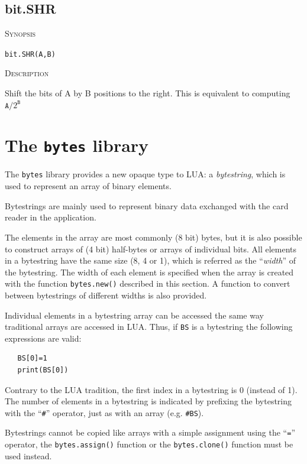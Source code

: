 \documentclass[11pt]{report}
\newcommand{\mansection}[1]{\vspace{0.5em}\par\noindent\textsc{#1}\vspace{0.5em}\par}
\newcommand{\syn}[1]{\texttt{#1}}
\begin{document}
\subsection{bit.SHR}

\mansection{Synopsis}
\syn{bit.SHR(A,B)}

\mansection{Description}
  Shift the bits of A by B positions to the right. 
  This is equivalent to computing $\syn{A}/2^{\syn{B}}$

\section{The \syn{bytes} library}

The \syn{bytes} library provides a new opaque type to LUA: a \textit{bytestring}, 
which is used to represent an array of binary elements. 

Bytestrings are mainly used to represent binary data exchanged with
the card reader in the application.

The elements in the array are most commonly (8 bit) bytes, but
it is also possible to construct arrays of (4 bit) half-bytes or
arrays of individual bits. All elements in a bytestring have the same
size (8, 4 or 1), which is referred as the ``\emph{width}'' of the bytestring.
The width of each element is specified when the array is created 
with the function \syn{bytes.new()} described in this section. 
A function to convert between bytestrings of different widths 
is also provided.

Individual elements in a bytestring array can be accessed the same 
way traditional arrays are accessed in LUA. Thus, if \syn{BS} is
a bytestring the following expressions are valid:

\begin{verbatim}
   BS[0]=1
   print(BS[0])
\end{verbatim} 

Contrary to the LUA tradition, the first index in a bytestring is 0
(instead of 1). The number of elements in a bytestring is indicated 
by prefixing the bytestring with the ``\syn{\#}'' operator, just as 
with an array (e.g. \syn{\#BS}).

Bytestrings cannot be copied like arrays with a simple assignment 
using the ``\syn{=}'' operator, the \syn{bytes.assign()} function
or the \syn{bytes.clone()} function must be used instead.  
\end{document}
